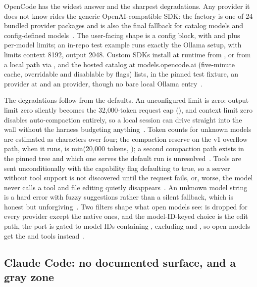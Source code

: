 \documentclass{article}
\newcommand{\occ}[0]{OpenCode}
\begin{document}
\occ{} has the widest answer and the sharpest degradations. Any provider
it does not know rides the generic OpenAI-compatible SDK: the factory is
one of 24 bundled provider packages and is also the final fallback for
catalog models and config-defined
models~\citep{opencodeRepo}. The user-facing shape is a config
block,  with  and
 plus per-model limits; an in-repo test example
runs exactly the Ollama setup, 
with limits context 8192, output 2048. Custom SDKs install at runtime
from , or from a local path via , and the hosted
catalog at models.opencode.ai (five-minute cache, overridable and
disablable by flags) lists, in the pinned test fixture, an
 provider at  and an
 provider, though no bare local Ollama
entry~\citep{opencodeRepo}.

The degradations follow from the defaults. An unconfigured limit is
zero: output limit zero silently becomes the 32{,}000-token request cap
(), and context limit zero disables
auto-compaction entirely, so a local session can drive straight into the
wall without the harness budgeting anything~\citep{opencodeRepo}. Token
counts for unknown models are estimated as characters over four; the
compaction reserve on the v1 overflow path, when it runs, is
min(20{,}000 tokens, ); a second compaction path
exists in the pinned tree and which one serves the default run is
unresolved~\citep{opencodeRepo}. Tools are sent unconditionally with the
capability flag defaulting to true, so a server without tool support is
not discovered until the request fails, or, worse, the model never
calls a tool and file editing quietly
disappears~\citep{opencodeRepo}. An unknown model string is a hard error
with fuzzy suggestions rather than a silent fallback, which is honest but
unforgiving~\citep{opencodeRepo}. Two filters shape what open models
see:  is dropped for every provider except the native
ones, and the model-ID-keyed choice is the edit path, the
 port is gated to model IDs containing ,
excluding  and , so open models get the
 and  tools instead~\citep{opencodeRepo}.

\subsection{Claude Code: no documented surface, and a gray zone}
\label{sec:compatccc}
\end{document}
